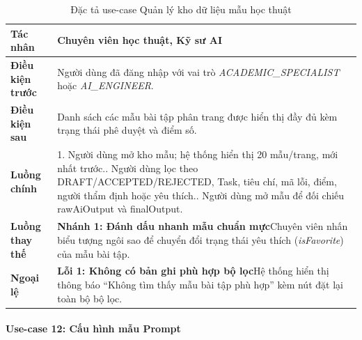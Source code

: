 \begingroup
\small
\begin{longtable}{|p{3.2cm}|p{\dimexpr\linewidth-3.2cm-4\tabcolsep-3\arrayrulewidth\relax}|}
\caption{Đặc tả use-case Quản lý kho dữ liệu mẫu học thuật}
\label{aihub:tab:uc_academic_inventory}\\
\hline
\textbf{Tác nhân} & Chuyên viên học thuật, Kỹ sư AI \\ \hline
\textbf{Điều kiện trước} & Người dùng đã đăng nhập với vai trò \textit{ACADEMIC\_SPECIALIST} hoặc \textit{AI\_ENGINEER}. \\ \hline
\textbf{Điều kiện sau} & Danh sách các mẫu bài tập phân trang được hiển thị đầy đủ kèm trạng thái phê duyệt và điểm số. \\ \hline
\textbf{Luồng chính} & 1. Người dùng mở kho mẫu; hệ thống hiển thị 20 mẫu/trang, mới nhất trước.\newline 2. Người dùng lọc theo DRAFT/ACCEPTED/REJECTED, Task, tiêu chí, mã lỗi, điểm, người thẩm định hoặc yêu thích.\newline 3. Người dùng mở mẫu để đối chiếu rawAiOutput và finalOutput. \\ \hline
\textbf{Luồng thay thế} &
\textbf{Nhánh 1: Đánh dấu nhanh mẫu chuẩn mực}\newline Chuyên viên nhấn biểu tượng ngôi sao để chuyển đổi trạng thái yêu thích (\textit{isFavorite}) của mẫu bài tập. \\ \hline
\textbf{Ngoại lệ} &
\textbf{Lỗi 1: Không có bản ghi phù hợp bộ lọc}\newline Hệ thống hiển thị thông báo ``Không tìm thấy mẫu bài tập phù hợp'' kèm nút đặt lại toàn bộ bộ lọc. \\ \hline
\end{longtable}
\endgroup


\paragraph{Use-case 12: Cấu hình mẫu Prompt}

